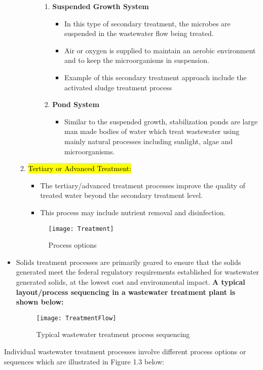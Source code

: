 \begin{itemize}
\begin{enumerate}
\begin{itemize}
\begin{enumerate}
			\item \textbf{Suspended Growth System}
				\begin{itemize}
				\item In this type of secondary treatment, the microbes are suspended in the
				wastewater flow being treated. 
				\item Air or oxygen is supplied to maintain an aerobic environment and to keep the microorganisms in 							suspension. 
				\item Example of this secondary treatment approach include the activated sludge treatment process 
				\end{itemize}
			\item \textbf{Pond System}
				\begin{itemize}
				\item Similar to the suspended growth, stabilization ponds are large man made bodies of water which treat 						wastewater using mainly natural processes including sunlight, algae and microorganisms.
				\end{itemize}
			\end{enumerate}
		\end{itemize}


\item \hl{Tertiary or Advanced Treatment:}
	\begin{itemize}
	\item  The tertiary/advanced treatment processes improve the quality of treated water beyond the secondary treatment level. 
	\item  This process may include nutrient removal and disinfection.
	\end{itemize}
	\begin{figure}[h!]
	\centering
\begin{center}
\texttt{[image: Treatment]}
\caption{Process options}
\end{center}
\end{figure}
\end{enumerate}
\vspace{0.5cm}
\item Solids treatment processes are primarily geared to ensure that the solids generated meet the federal regulatory requirements established for wastewater generated solids, at the lowest cost and environmental impact.
\newpage
\textbf{A typical layout/process sequencing in a wastewater treatment plant is shown below:}

	\begin{figure}[h!]
	\centering
\begin{center}
\texttt{[image: TreatmentFlow]}
\end{center}
\caption{Typical wastewater treatment process sequencing}
\end{figure}
\end{itemize}
Individual wastewater treatment processes involve different process options or sequences which are illustrated in Figure 1.3 below:


